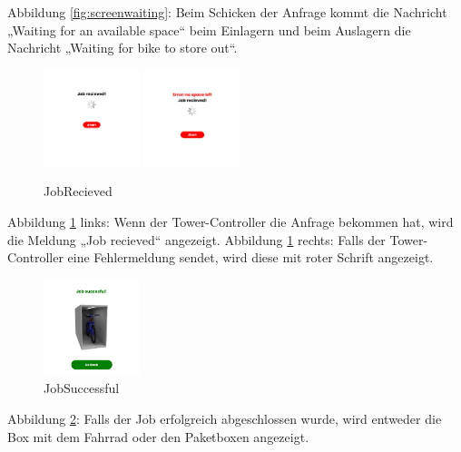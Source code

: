 \noindent Abbildung \ref{fig:screenwaiting}: Beim Schicken der Anfrage kommt die Nachricht „Waiting for an available space“ beim Einlagern und beim Auslagern die Nachricht „Waiting for bike to store out“.

\begin{figure}[H]
  \centering
  \includegraphics[width=0.25\textwidth]{images/app-screenshots/recieved.png}
  \includegraphics[width=0.25\textwidth]{images/app-screenshots/error.png}
  \caption{JobRecieved}
  \label{fig:screenrecieved}
\end{figure}


\noindent Abbildung \ref{fig:screenrecieved} links: Wenn der Tower-Controller die Anfrage bekommen hat, wird die Meldung „Job recieved“ angezeigt.
\noindent Abbildung \ref{fig:screenrecieved} rechts: Falls der Tower-Controller eine Fehlermeldung sendet, wird diese mit roter Schrift angezeigt.

\begin{figure}[H]
  \centering
  \includegraphics[width=0.25\textwidth]{images/app-screenshots/succes.png}
  \caption{JobSuccessful}
  \label{fig:success}
\end{figure}

\noindent Abbildung \ref{fig:success}: Falls der Job erfolgreich abgeschlossen wurde, wird entweder die Box mit dem Fahrrad oder den Paketboxen angezeigt.
